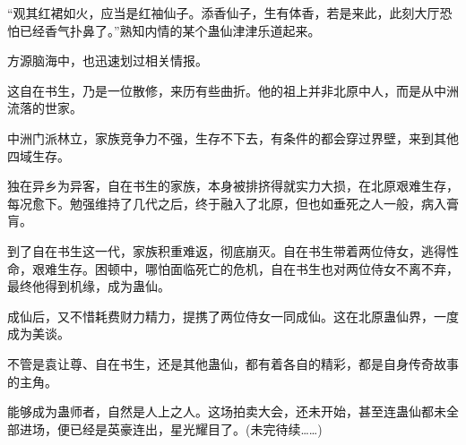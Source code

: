 \begin{this_body}
“观其红裙如火，应当是红袖仙子。添香仙子，生有体香，若是来此，此刻大厅恐怕已经香气扑鼻了。”熟知内情的某个蛊仙津津乐道起来。

方源脑海中，也迅速划过相关情报。

这自在书生，乃是一位散修，来历有些曲折。他的祖上并非北原中人，而是从中洲流落的世家。

中洲门派林立，家族竞争力不强，生存不下去，有条件的都会穿过界壁，来到其他四域生存。

独在异乡为异客，自在书生的家族，本身被排挤得就实力大损，在北原艰难生存，每况愈下。勉强维持了几代之后，终于融入了北原，但也如垂死之人一般，病入膏肓。

到了自在书生这一代，家族积重难返，彻底崩灭。自在书生带着两位侍女，逃得性命，艰难生存。困顿中，哪怕面临死亡的危机，自在书生也对两位侍女不离不弃，最终他得到机缘，成为蛊仙。

成仙后，又不惜耗费财力精力，提携了两位侍女一同成仙。这在北原蛊仙界，一度成为美谈。

不管是袁让尊、自在书生，还是其他蛊仙，都有着各自的精彩，都是自身传奇故事的主角。

能够成为蛊师者，自然是人上之人。这场拍卖大会，还未开始，甚至连蛊仙都未全部进场，便已经是英豪连出，星光耀目了。(未完待续……)

\end{this_body}

